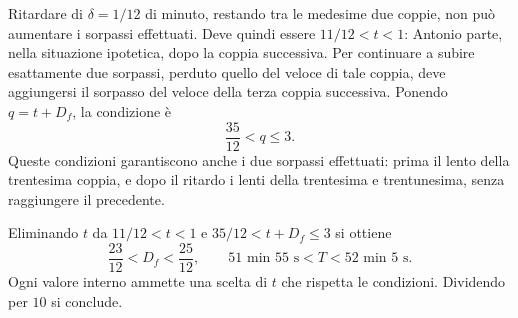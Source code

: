 {Ritardare di $\delta=1/12$ di minuto, restando tra le medesime due coppie, non può aumentare i sorpassi effettuati. Deve quindi essere $11/12<t<1$: Antonio parte, nella situazione ipotetica, dopo la coppia successiva. Per continuare a subire esattamente due sorpassi, perduto quello del veloce di tale coppia, deve aggiungersi il sorpasso del veloce della terza coppia successiva. Ponendo $q=t+D_f$, la condizione è
\[
\frac{35}{12}<q\leq3.
\]
Queste condizioni garantiscono anche i due sorpassi effettuati: prima il lento della trentesima coppia, e dopo il ritardo i lenti della trentesima e trentunesima, senza raggiungere il precedente.

Eliminando $t$ da $11/12<t<1$ e $35/12<t+D_f\leq3$ si ottiene
\[
\frac{23}{12}<D_f<\frac{25}{12},\qquad
51\text{ min }55\text{ s}<T<52\text{ min }5\text{ s}.
\]
Ogni valore interno ammette una scelta di $t$ che rispetta le condizioni. Dividendo per $10$ si conclude.
}
